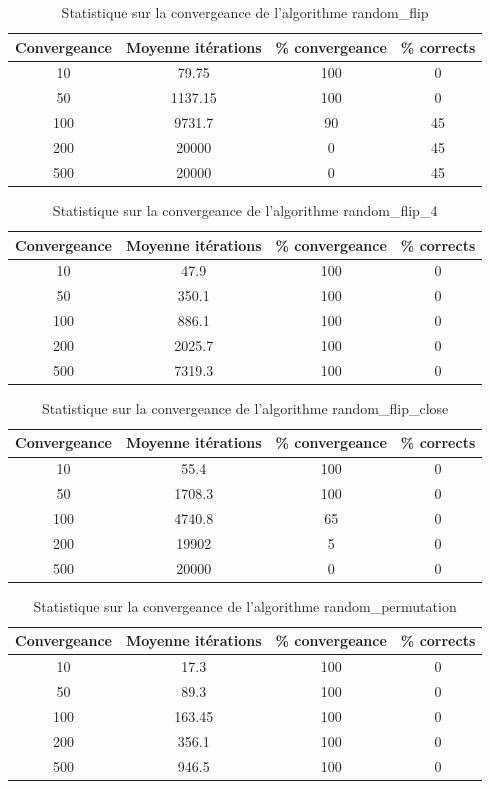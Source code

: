 \documentclass[11pt]{report}
\begin{document}
\begin{table}[!h]
\centering
\begin{tabular}{|c|c|c|c|}
  \hline
  Convergeance & Moyenne itérations & \% convergeance & \% corrects \\
  \hline
  10 & 79.75 & 100 & 0\\
  \hline
  50 & 1137.15 & 100 & 0\\
  \hline
  100 & 9731.7 & 90 & 45 \\
  \hline
  200 & 20000 & 0 & 45 \\
  \hline
  500 & 20000 & 0 & 45 \\
  \hline
\end{tabular}
\caption{\label{stats_conv1} Statistique sur la convergeance de l'algorithme random\_flip }
\end{table}
\begin{table}[!h]
\centering
\begin{tabular}{|c|c|c|c|}
  \hline
  Convergeance & Moyenne itérations & \% convergeance & \% corrects \\
  \hline
  10 & 47.9 & 100 & 0\\
  \hline
  50 & 350.1 & 100 & 0\\
  \hline
  100 & 886.1 & 100 & 0 \\
  \hline
  200 & 2025.7 & 100 & 0 \\
  \hline
  500 & 7319.3 & 100 & 0 \\
  \hline
\end{tabular}
\caption{\label{stats_conv2} Statistique sur la convergeance de l'algorithme random\_flip\_4 }
\end{table}
\begin{table}[!h]
\centering
\begin{tabular}{|c|c|c|c|}
  \hline
  Convergeance & Moyenne itérations & \% convergeance & \% corrects \\
  \hline
  10 & 55.4 & 100 & 0\\
  \hline
  50 & 1708.3 & 100 & 0\\
  \hline
  100 & 4740.8 & 65 & 0 \\
  \hline
  200 & 19902 & 5 & 0 \\
  \hline
  500 & 20000 & 0 & 0 \\
  \hline
\end{tabular}
\caption{\label{stats_conv3} Statistique sur la convergeance de l'algorithme random\_flip\_close }
\end{table}
\begin{table}[!h]
\centering
\begin{tabular}{|c|c|c|c|}
  \hline
  Convergeance & Moyenne itérations & \% convergeance & \% corrects \\
  \hline
  10 & 17.3 & 100 & 0\\
  \hline
  50 & 89.3 & 100 & 0\\
  \hline
  100 & 163.45 & 100 & 0 \\
  \hline
  200 & 356.1 & 100 & 0 \\
  \hline
  500 & 946.5 & 100 &  0\\
  \hline
\end{tabular}
\caption{\label{stats_conv4} Statistique sur la convergeance de l'algorithme random\_permutation }
\end{table}
\end{document}
